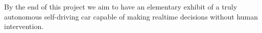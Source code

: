 \documentclass[12pt]{article}
\begin{document}
By the end of this project we aim to have an elementary exhibit of a truly autonomous self-driving car capable of making realtime decisions without human intervention.

\newpage



\newpage



\newpage



\newpage



\newpage



\newpage



\newpage


\end{document}
